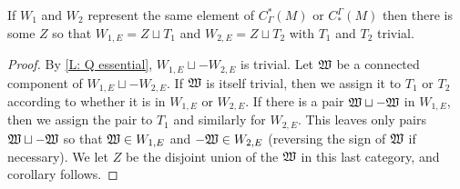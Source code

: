 \begin{corollary}\label{C: Q essential}
If $W_1$ and $W_2$ represent the same element of $C^*_\Gamma(M)$ or $C_*^\Gamma(M)$ then there is some $Z$ so that $W_{1,E} = Z \sqcup T_1$ and $W_{2,E} = Z \sqcup T_2$ with $T_1$ and $T_2$ trivial.
\end{corollary}
\begin{proof}
By \cref{L: Q essential}, $W_{1,E} \sqcup -W_{2,E}$ is trivial. Let $\mathfrak W$ be a connected component of $W_{1,E} \sqcup -W_{2,E}$. If $\mathfrak W$ is itself trivial, then we assign it to $T_1$ or $T_2$ according to whether it is in $W_{1,E}$ or $W_{2,E}$. If there is a pair $\mathfrak W \sqcup -\mathfrak W$ in $W_{1,E}$, then we assign the pair to $T_1$ and similarly for $W_{2,E}$. This leaves only pairs $\mathfrak W \sqcup -\mathfrak W$ so that $\mathfrak W \in W_{1,E}$ and $-\mathfrak W \in W_{2,E}$ (reversing the sign of $\mathfrak W$ if necessary). We let $Z$ be the disjoint union of the $\mathfrak W$ in this last category, and corollary follows.
\end{proof}




